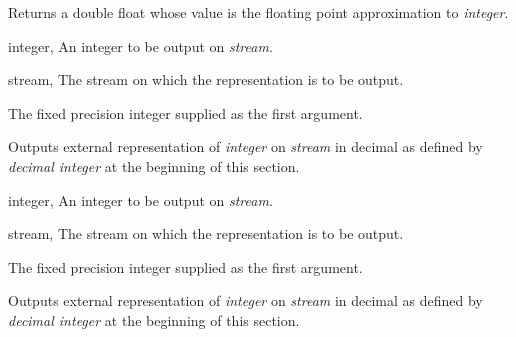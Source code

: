 \begin{optDefinition}
\result%
Returns a double float whose value is the floating point approximation
to {\em integer}.

\begin{specargs}
\item[integer, \classref{fixed-precision-integer}] An integer to be output on {\em stream}.
\item[stream, \classref{stream}] The stream on which the representation is
to be output.
\end{specargs}

\result%
The fixed precision integer supplied as the first argument.

\remarks%
Outputs external representation of {\em integer\/} on {\em stream\/}
in decimal as defined by {\em decimal integer} at the beginning of
this section.

\begin{specargs}
\item[integer, \classref{fixed-precision-integer}] An integer to be output on {\em stream}.
\item[stream, \classref{stream}] The stream on which the representation is
to be output.
\end{specargs}

\result%
The fixed precision integer supplied as the first argument.

\remarks%
Outputs external representation of {\em integer\/} on {\em stream\/}
in decimal as defined by {\em decimal integer} at the beginning of
this section.

\end{optDefinition}

